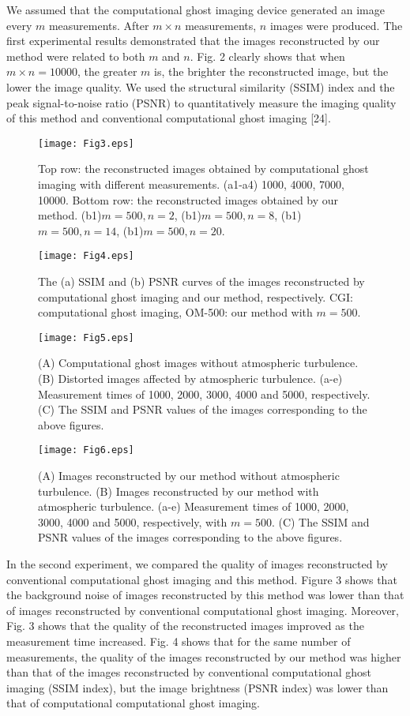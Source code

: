 \documentclass[letterpaper,10pt]{article}
\begin{document}
We assumed that the computational ghost imaging device generated an image
every $m$ measurements. After $m\times n$ measurements, $n$ images were
produced. The first experimental results demonstrated that the images
reconstructed by our method were related to both $m$ and $n$. Fig. 2 clearly
shows that when $m\times n=10000$, the greater $m$ is, the brighter the
reconstructed image, but the lower the image quality. We used the structural
similarity (SSIM) index and the peak signal-to-noise ratio (PSNR) to
quantitatively measure the imaging quality of this method and conventional
computational ghost imaging [24].
\begin{figure}[ptbh]
\centering\texttt{[image: Fig3.eps]}
\caption{Top row: the reconstructed images obtained by computational ghost
imaging with different measurements. (a1-a4) 1000, 4000, 7000, 10000. Bottom
row: the reconstructed images obtained by our method. (b1)$m=500, n=2$, (b1)$%
m=500, n=8$, (b1)$m=500, n=14$, (b1)$m=500, n=20$.}
\end{figure}
\begin{figure}[ptbh]
\centering\texttt{[image: Fig4.eps]}
\caption{The (a) SSIM and (b) PSNR curves of the images reconstructed by
computational ghost imaging and our method, respectively. CGI: computational
ghost imaging, OM-500: our method with $m=500$.}
\end{figure}
\begin{figure}[ptbh]
\centering\texttt{[image: Fig5.eps]}
\caption{(A) Computational ghost images without atmospheric turbulence. (B)
Distorted images affected by atmospheric turbulence. (a-e) Measurement times
of 1000, 2000, 3000, 4000 and 5000, respectively. (C) The SSIM and PSNR
values of the images corresponding to the above figures.}
\end{figure}
\begin{figure}[ptbh]
\centering\texttt{[image: Fig6.eps]}
\caption{(A) Images reconstructed by our method without atmospheric
turbulence. (B) Images reconstructed by our method with atmospheric
turbulence. (a-e) Measurement times of 1000, 2000, 3000, 4000 and 5000,
respectively, with $m=500$. (C) The SSIM and PSNR values of the images
corresponding to the above figures.}
\end{figure}

In the second experiment, we compared the quality of images reconstructed by
conventional computational ghost imaging and this method. Figure 3 shows
that the background noise of images reconstructed by this method was lower
than that of images reconstructed by conventional computational ghost
imaging. Moreover, Fig. 3 shows that the quality of the reconstructed images
improved as the measurement time increased. Fig. 4 shows that for the same
number of measurements, the quality of the images reconstructed by our
method was higher than that of the images reconstructed by conventional
computational ghost imaging (SSIM index), but the image brightness (PSNR
index) was lower than that of computational computational ghost imaging.
\end{document}
